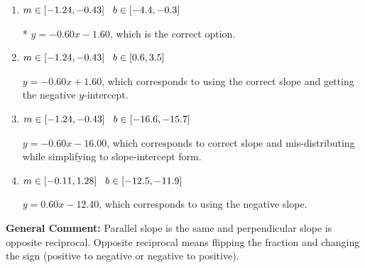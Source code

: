 \documentclass{extbook}[14pt]
\begin{document}
\begin{enumerate}
{\begin{enumerate}[label=\Alph*.]
 $y = -1.67x - 1.60$, which corresponds to using the reciprocal slope $(1/m)$.
\item \( m \in [-1.24, -0.43] \hspace*{3mm} b \in [-4.4, -0.3] \)

* $y = -0.60x - 1.60$, which is the correct option.
\item \( m \in [-1.24, -0.43] \hspace*{3mm} b \in [0.6, 3.5] \)

 $y = -0.60x + 1.60$, which corresponds to using the correct slope and getting the negative $y$-intercept.
\item \( m \in [-1.24, -0.43] \hspace*{3mm} b \in [-16.6, -15.7] \)

 $y = -0.60x - 16.00$, which corresponds to correct slope and mis-distributing while simplifying to slope-intercept form.
\item \( m \in [-0.11, 1.28] \hspace*{3mm} b \in [-12.5, -11.9] \)

 $y = 0.60x - 12.40$, which corresponds to using the negative slope.
\end{enumerate}

\textbf{General Comment:} Parallel slope is the same and perpendicular slope is opposite reciprocal. Opposite reciprocal means flipping the fraction and changing the sign (positive to negative or negative to positive).
}
\end{enumerate}
\end{document}
